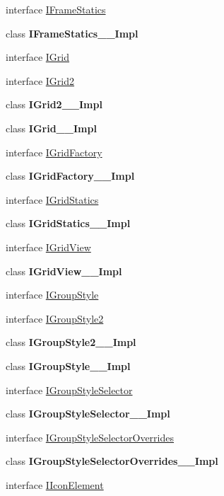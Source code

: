 \begin{DoxyCompactItemize}
interface \hyperlink{interface_windows_1_1_u_i_1_1_xaml_1_1_controls_1_1_i_frame_statics}{I\+Frame\+Statics}
\item 
class {\bfseries I\+Frame\+Statics\+\_\+\+\_\+\+Impl}
\item 
interface \hyperlink{interface_windows_1_1_u_i_1_1_xaml_1_1_controls_1_1_i_grid}{I\+Grid}
\item 
interface \hyperlink{interface_windows_1_1_u_i_1_1_xaml_1_1_controls_1_1_i_grid2}{I\+Grid2}
\item 
class {\bfseries I\+Grid2\+\_\+\+\_\+\+Impl}
\item 
class {\bfseries I\+Grid\+\_\+\+\_\+\+Impl}
\item 
interface \hyperlink{interface_windows_1_1_u_i_1_1_xaml_1_1_controls_1_1_i_grid_factory}{I\+Grid\+Factory}
\item 
class {\bfseries I\+Grid\+Factory\+\_\+\+\_\+\+Impl}
\item 
interface \hyperlink{interface_windows_1_1_u_i_1_1_xaml_1_1_controls_1_1_i_grid_statics}{I\+Grid\+Statics}
\item 
class {\bfseries I\+Grid\+Statics\+\_\+\+\_\+\+Impl}
\item 
interface \hyperlink{interface_windows_1_1_u_i_1_1_xaml_1_1_controls_1_1_i_grid_view}{I\+Grid\+View}
\item 
class {\bfseries I\+Grid\+View\+\_\+\+\_\+\+Impl}
\item 
interface \hyperlink{interface_windows_1_1_u_i_1_1_xaml_1_1_controls_1_1_i_group_style}{I\+Group\+Style}
\item 
interface \hyperlink{interface_windows_1_1_u_i_1_1_xaml_1_1_controls_1_1_i_group_style2}{I\+Group\+Style2}
\item 
class {\bfseries I\+Group\+Style2\+\_\+\+\_\+\+Impl}
\item 
class {\bfseries I\+Group\+Style\+\_\+\+\_\+\+Impl}
\item 
interface \hyperlink{interface_windows_1_1_u_i_1_1_xaml_1_1_controls_1_1_i_group_style_selector}{I\+Group\+Style\+Selector}
\item 
class {\bfseries I\+Group\+Style\+Selector\+\_\+\+\_\+\+Impl}
\item 
interface \hyperlink{interface_windows_1_1_u_i_1_1_xaml_1_1_controls_1_1_i_group_style_selector_overrides}{I\+Group\+Style\+Selector\+Overrides}
\item 
class {\bfseries I\+Group\+Style\+Selector\+Overrides\+\_\+\+\_\+\+Impl}
\item 
interface \hyperlink{interface_windows_1_1_u_i_1_1_xaml_1_1_controls_1_1_i_icon_element}{I\+Icon\+Element}

\end{DoxyCompactItemize}
